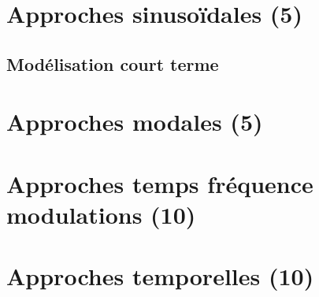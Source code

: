\section{Approches sinusoïdales (5)}

\subsection{Modélisation court terme}


\section{Approches modales (5)}

\section{Approches temps fréquence modulations (10)}

\section{Approches temporelles (10)}
